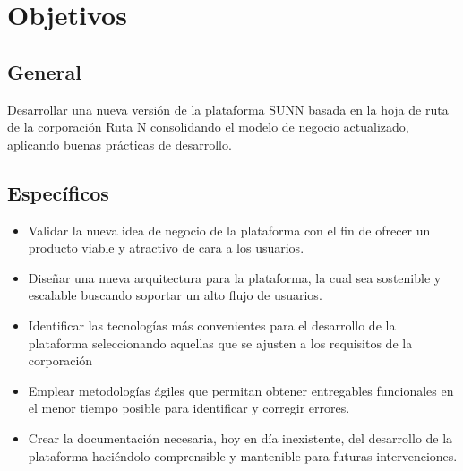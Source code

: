 \chapter*{Objetivos}
\section*{General}
Desarrollar  una  nueva  versión  de  la  plataforma  SUNN basada en la hoja de ruta de la corporación Ruta N consolidando el modelo de negocio actualizado, aplicando buenas prácticas de desarrollo.

\section*{Específicos}
\begin{itemize}
	\item Validar la nueva idea de negocio de la plataforma con el fin de ofrecer un producto viable y atractivo de cara a los usuarios.
	
	\item Diseñar una nueva arquitectura para la plataforma, la cual sea sostenible y escalable buscando soportar un alto flujo de usuarios.
	
	\item Identificar las tecnologías más convenientes para el desarrollo de la plataforma seleccionando aquellas que se ajusten a los requisitos de la corporación
	
	\item Emplear metodologías ágiles que permitan obtener entregables funcionales en el menor tiempo posible para identificar y corregir errores.
	
	\item Crear la documentación necesaria, hoy en día inexistente, del desarrollo de la plataforma haciéndolo comprensible y mantenible para futuras intervenciones.
\end{itemize}